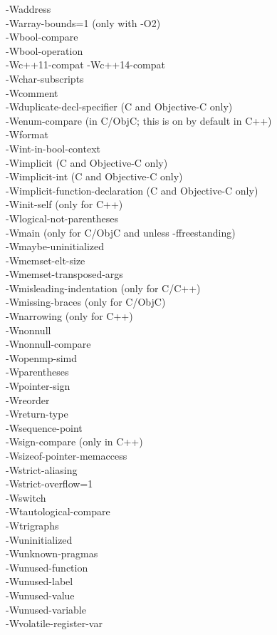 \documentclass[headings=appendixprefix]{scrreprt}
\begin{document}
-Waddress\\   
-Warray-bounds=1 (only with -O2)\\
-Wbool-compare\\
-Wbool-operation\\
-Wc++11-compat  -Wc++14-compat\\
-Wchar-subscripts\\
-Wcomment\\
-Wduplicate-decl-specifier (C and Objective-C only)\\
-Wenum-compare (in C/ObjC; this is on by default in C++)\\
-Wformat\\
-Wint-in-bool-context\\
-Wimplicit (C and Objective-C only)\\
-Wimplicit-int (C and Objective-C only)\\
-Wimplicit-function-declaration (C and Objective-C only)\\
-Winit-self (only for C++)\\
-Wlogical-not-parentheses\\
-Wmain (only for C/ObjC and unless -ffreestanding)\\
-Wmaybe-uninitialized\\
-Wmemset-elt-size\\
-Wmemset-transposed-args\\
-Wmisleading-indentation (only for C/C++)\\
-Wmissing-braces (only for C/ObjC)\\
-Wnarrowing (only for C++)\\
-Wnonnull\\
-Wnonnull-compare\\
-Wopenmp-simd\\
-Wparentheses\\
-Wpointer-sign\\
-Wreorder\\
-Wreturn-type\\
-Wsequence-point\\
-Wsign-compare (only in C++)\\
-Wsizeof-pointer-memaccess\\
-Wstrict-aliasing\\
-Wstrict-overflow=1\\
-Wswitch\\
-Wtautological-compare\\
-Wtrigraphs\\
-Wuninitialized\\
-Wunknown-pragmas\\
-Wunused-function\\
-Wunused-label\\
-Wunused-value\\
-Wunused-variable\\
-Wvolatile-register-var
\end{document}
